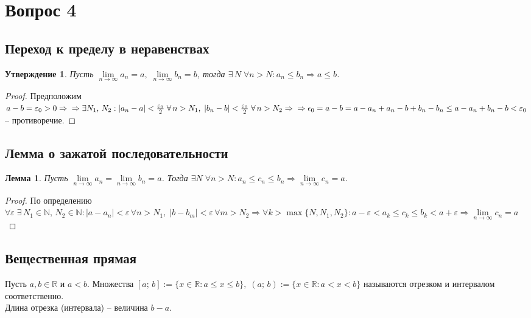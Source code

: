 \documentclass[12pt]{article}
\newtheorem{statement}{Утверждение}
\newtheorem{lemma}{Лемма}
\begin{document}
\section*{Вопрос 4}
\subsection*{Переход к пределу в неравенствах}
\begin{statement}
Пусть $\lim\limits_{n\to\infty} a_n = a,\;\lim\limits_{n\to\infty} b_n = b$, тогда $\exists\,N\;\forall n > N: a_n \le b_n \Rightarrow a \le b$.
\end{statement}
\begin{proof}
Предположим $a - b = \varepsilon_0 > 0 \Rightarrow\\\Rightarrow \exists N_1,\, N_2: \left|a_n - a\right| < \frac{\varepsilon_0}{2}\;\forall\, n>N_1,\; \left|b_n - b\right| < \frac{\varepsilon_0}{2}\; \forall\, n>N_2 \Rightarrow\\\Rightarrow \epsilon_0 = a - b = a - a_n + a_n - b + b_n - b_n \le a - a_n + b_n - b < \varepsilon_0$ -- противоречие. 
\end{proof}
\subsection*{Лемма о зажатой последовательности}
\begin{lemma}
Пусть $\lim\limits_{n\to\infty} a_n = \lim\limits_{n\to\infty} b_n = a$. Тогда $\exists N\;\forall n>N: a_n \le c_n \le b_n \Rightarrow \lim\limits_{n\to\infty} c_n = a$.
\end{lemma}
\begin{proof}
По определению $\forall\varepsilon\;\exists\, N_1\in\mathbb{N},\,N_2\in\mathbb{N}: \left|a - a_n\right| < \varepsilon\,\forall n > N_1,\; \left|b - b_m\right| < \varepsilon\, \forall m > N_2 \Rightarrow \forall k > \max\{N, N_1, N_2\}: a - \varepsilon < a_k \le c_k \le b_k < a + \varepsilon \Rightarrow \lim\limits_{n\to\infty} c_n = a$
\end{proof}
\subsection*{Вещественная прямая}
Пусть $a, b \in\mathbb{R}$ и $a < b$. Множества $[a;\, b] := \{x\in\mathbb{R}: a \le x \le b\},\; (a;\, b):=\{x\in\mathbb{R}: a < x < b\}$ называются отрезком и интервалом соответственно.\\
Длина отрезка (интервала) -- величина $b - a$. 
\end{document}
